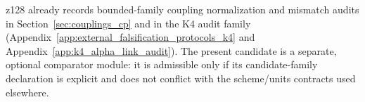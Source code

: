\begin{remark}\label{rem:alpha_geo_relation_to_z128_audits}
\AuditTag z128 already records bounded-family coupling normalization and mismatch audits in Section~\ref{sec:couplings_cp} and in the K4 audit family (Appendix~\ref{app:external_falsification_protocols_k4} and Appendix~\ref{app:k4_alpha_link_audit}).
The present candidate is a separate, optional comparator module: it is admissible only if its candidate-family declaration is explicit and does not conflict with the scheme/units contracts used elsewhere.
\end{remark}

